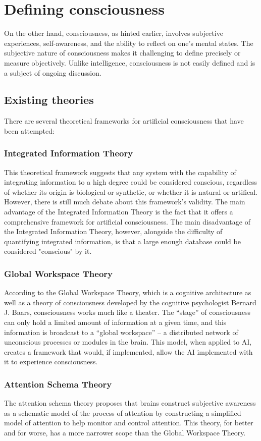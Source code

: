 \documentclass[masterthesis]{fer}
\begin{document}
\section{Defining consciousness}
On the other hand, consciousness, as hinted earlier,  involves subjective experiences, self-awareness, and the ability to reflect on one's mental states. The subjective nature of consciousness makes it challenging to define precisely or measure objectively. 
Unlike intelligence, consciousness is not easily defined and is a subject of ongoing discussion.
\subsection{Existing theories}
There are several theoretical frameworks for artificial consciousness that have been attempted:
\subsubsection{Integrated Information Theory}
This theoretical framework suggests that any system with the capability of integrating information to a high degree could be considered conscious, regardless of whether its origin is biological or synthetic, or whether it is natural or artifical. However, there is still much debate about this framework's validity.
The main advantage of the Integrated Information Theory is the fact that it offers a comprehensive framework for artificial consciousness.
The main disadvantage of the Integrated Information Theory, however, alongside the difficulty of quantifying integrated information, is that a large enough database could be considered "conscious" by it.
\subsubsection{Global Workspace Theory}
According to the Global Workspace Theory, which is a cognitive architecture as well as a theory of consciousness developed by the cognitive psychologist Bernard J. Baars, consciousness works much like a theater.
The “stage” of consciousness can only hold a limited amount of information at a given time, and this information is broadcast to a “global workspace” – a distributed network of unconscious processes or modules in the brain.
This model, when applied to AI, creates a framework that would, if implemented, allow the AI implemented with it to experience consciousness.
\subsubsection{Attention Schema Theory}
The attention schema theory proposes that brains construct subjective awareness as a schematic model of the process of attention by constructing a simplified model of attention to help monitor and control attention.
This theory, for better and for worse, has a more narrower scope than the Global Workspace Theory.
\end{document}
